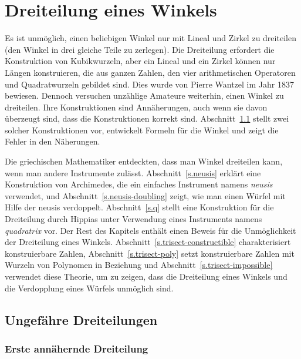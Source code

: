 
\chapter{Dreiteilung eines Winkels}\label{c.trisect}


Es ist unmöglich, einen beliebigen Winkel nur mit Lineal und Zirkel zu dreiteilen (den Winkel in drei gleiche Teile zu zerlegen). Die Dreiteilung erfordert die Konstruktion von Kubikwurzeln, aber ein Lineal und ein Zirkel können nur Längen konstruieren, die aus ganzen Zahlen, den vier arithmetischen Operatoren und Quadratwurzeln gebildet sind. Dies wurde von Pierre Wantzel im Jahr 1837 bewiesen. Dennoch versuchen unzählige Amateure weiterhin, einen Winkel zu dreiteilen. Ihre Konstruktionen sind Annäherungen, auch wenn sie davon überzeugt sind, dass die Konstruktionen korrekt sind. Abschnitt~\ref{s.trisect-approx} stellt zwei solcher Konstruktionen vor, entwickelt Formeln für die Winkel und zeigt die Fehler in den Näherungen.

Die griechischen Mathematiker entdeckten, dass man Winkel dreiteilen kann, wenn man andere Instrumente zulässt. Abschnitt~\ref{s.neusis} erklärt eine Konstruktion von Archimedes, die ein einfaches Instrument namens \emph{neusis} verwendet, und Abschnitt~\ref{s.neusis-doubling} zeigt, wie man einen Würfel mit Hilfe der neusis verdoppelt. Abschnitt~\ref{s.q} stellt eine Konstruktion für die Dreiteilung durch Hippias unter Verwendung eines Instruments namens \emph{quadratrix} vor. Der Rest des Kapitels enthält einen Beweis für die Unmöglichkeit der Dreiteilung eines Winkels. Abschnitt~\ref{s.trisect-constructible} charakterisiert konstruierbare Zahlen, Abschnitt~\ref{s.trisect-poly} setzt konstruierbare Zahlen mit Wurzeln von Polynomen in Beziehung und Abschnitt~\ref{s.trisect-impossible} verwendet diese Theorie, um zu zeigen, dass die Dreiteilung eines Winkels und die Verdopplung eines Würfels unmöglich sind.


\section{Ungefähre Dreiteilungen}\label{s.trisect-approx}

\subsection{Erste annähernde Dreiteilung}\label{sub.trisect-approx1}

